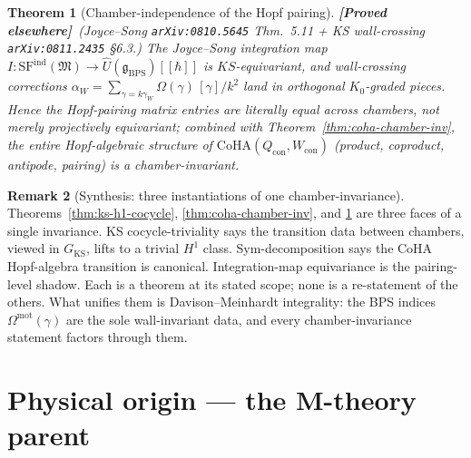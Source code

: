 \documentclass[11pt]{amsart}
\newtheorem{theorem}{Theorem}[section]
\theoremstyle{definition}
\newtheorem{remark}[theorem]{Remark}
\providecommand{\CoHA}{\mathrm{CoHA}}
\providecommand{\fg}{\mathfrak{g}}
\providecommand{\ClaimStatusProvedElsewhere}{\textbf{\textsf{[Proved elsewhere]}}}
\begin{document}
\begin{theorem}[Chamber-independence of the Hopf pairing]
\label{thm:chamber-inv-pairing}
\ClaimStatusProvedElsewhere\ \emph{(Joyce--Song
\texttt{arXiv:0810.5645} Thm.~5.11 + KS wall-crossing
\texttt{arXiv:0811.2435} §6.3.)}
The Joyce--Song integration map
$I : \mathrm{SF}^{\mathrm{ind}}(\mathfrak{M}) \to
\widehat{U}(\fg_{\mathrm{BPS}})[[\hbar]]$
is $KS$-equivariant, and wall-crossing corrections
$\alpha_W = \sum_{\gamma = k\gamma_W} \Omega(\gamma)\,[\gamma]/k^2$
land in orthogonal $K_0$-graded pieces. Hence the Hopf-pairing
matrix entries are literally equal across chambers, not merely
projectively equivariant; combined with
Theorem~\ref{thm:coha-chamber-inv}, the entire Hopf-algebraic
structure of $\CoHA(Q_{\mathrm{con}}, W_{\mathrm{con}})$ (product,
coproduct, antipode, pairing) is a chamber-invariant.
\end{theorem}

\begin{remark}[Synthesis: three instantiations of one chamber-invariance]
\label{rem:three-chamber-invariances}
Theorems~\ref{thm:ks-h1-cocycle}, \ref{thm:coha-chamber-inv}, and
\ref{thm:chamber-inv-pairing} are three faces of a single invariance.
KS cocycle-triviality says the transition data between chambers,
viewed in $G_{\mathrm{KS}}$, lifts to a trivial $H^1$ class.
Sym-decomposition says the CoHA Hopf-algebra transition is canonical.
Integration-map equivariance is the pairing-level shadow. Each is a
theorem at its stated scope; none is a re-statement of the others.
What unifies them is Davison--Meinhardt integrality: the BPS indices
$\Omega^{\mathrm{mot}}(\gamma)$ are the sole wall-invariant data, and
every chamber-invariance statement factors through them.
\end{remark}

\section{Physical origin --- the M-theory parent}
\end{document}
